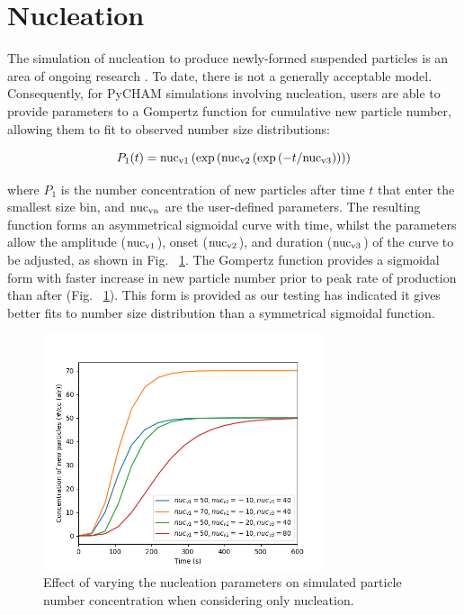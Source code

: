 \documentclass[gmd, manuscript]{copernicus}
\begin{document}
\section{Nucleation}\label{sec:nuc}

The simulation of nucleation to produce newly-formed suspended particles is an area of ongoing research \citep[e.g.][]{Kurten2018, Semeniuk2018, Li2020}.  To date, there is not a generally acceptable model.  Consequently, for PyCHAM simulations involving nucleation, users are able to provide parameters to a Gompertz function for cumulative new particle number, allowing them to fit to observed number size distributions:

\begin{equation} \label{eq:Gompertz}
P_{1}(t) = \rm{nuc_{v1}}\left(\exp \left(\rm{nuc_{v2}}\left(\exp \left(\mit{-t}/\rm{nuc_{v3}} \right) \right) \right) \right)
\end{equation}

where $P_{1}$ is the number concentration of new particles after time $t$ that enter the smallest size bin, and $\rm{nuc_{vn}}$ are the user-defined parameters.  The resulting function forms an asymmetrical sigmoidal curve with time, whilst the parameters allow the amplitude ($\rm{nuc_{v1}}$), onset ($\rm{nuc_{v2}}$), and duration ($\rm{nuc_{v3}}$) of the curve to be adjusted, as shown in Fig. ~\ref{fig:nuc_sens}.  The Gompertz function provides a sigmoidal form with faster increase in new particle number prior to peak rate of production than after (Fig. ~\ref{fig:nuc_sens}).  This form is provided as our testing has indicated it gives better fits to number size distribution than a symmetrical sigmoidal function.

\begin{figure}[t]
\includegraphics[width=8.3cm]{Results/nuc_sens.png}
\caption{Effect of varying the nucleation parameters on simulated particle number concentration when considering only nucleation.}
\label{fig:nuc_sens}
\end{figure}
\end{document}
